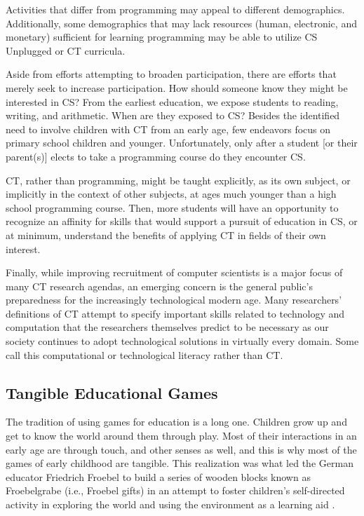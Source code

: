 \documentclass{acm_proc_article-sp}
\begin{document}
Activities that differ from programming may appeal to different demographics.
Additionally, some demographics that may lack resources (human, electronic, and monetary) sufficient for learning programming may be able to utilize CS Unplugged or CT curricula.

Aside from efforts attempting to broaden participation, there are efforts that merely seek to increase participation.
How should someone know they might be interested in CS?
From the earliest education, we expose students to reading, writing, and arithmetic.
When are they exposed to CS?
Besides the identified need to involve children with CT from an early age, few endeavors focus on primary school children and younger.
Unfortunately, only after a student [or their parent(s)] elects to take a programming course do they encounter CS. 

CT, rather than programming, might be taught explicitly, as its own subject, or implicitly in the context of other subjects, at ages much younger than a high school programming course.
Then, more students will have an opportunity to recognize an affinity for skills that would support a pursuit of education in CS, or at minimum, understand the benefits of applying CT in fields of their own interest.

Finally, while improving recruitment of computer scientists is a major focus of many CT research agendas, an emerging concern is the general public's preparedness for the increasingly technological modern age. Many researchers' definitions of CT attempt to specify important skills related to technology and computation that the researchers themselves predict to be necessary as our society continues to adopt technological solutions in virtually every domain. Some call this computational or technological literacy rather than CT.

\subsection{Tangible Educational Games}
\label{sec:ed_games}
The tradition of using games for education is a long one. 
Children grow up and get to know the world around them through play.
Most of their interactions in an early age are through touch, and other senses as well, and this is why most of the games of early childhood are tangible.
This realization was what led the German educator Friedrich Froebel to build a series of wooden blocks known as Froebelgrabe (i.e., Froebel gifts) in an attempt to foster children's self-directed activity in exploring the world and using the environment as a learning aid \cite{liebschner1992child}.
\end{document}
